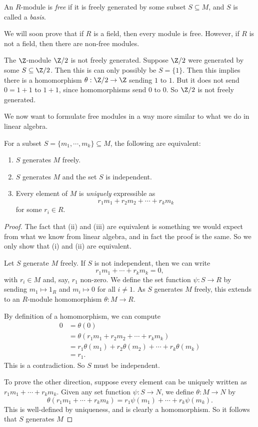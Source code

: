 \documentclass[a4paper]{article}
\begin{document}
\begin{defi}
  An $R$-module is \emph{free} if it is freely generated by some subset $S \subseteq M$, and $S$ is called a \emph{basis}.
\end{defi}
We will soon prove that if $R$ is a field, then every module is free. However, if $R$ is not a field, then there are non-free modules.
\begin{eg}
  The $\Z$-module $\Z/2$ is not freely generated. Suppose $\Z/2$ were generated by some $S \subseteq \Z/2$. Then this is can only possibly be $S = \{1\}$. Then this implies there is a homomorphism $\theta: \Z/2 \to \Z$ sending $1$ to $1$. But it does not send $0 = 1 + 1$ to $1 + 1$, since homomorphisms send $0$ to $0$. So $\Z/2$ is not freely generated.
\end{eg}

We now want to formulate free modules in a way more similar to what we do in linear algebra.
\begin{prop}
  For a subset $S = \{m_1, \cdots, m_k\} \subseteq M$, the following are equivalent:
  \begin{enumerate}
    \item $S$ generates $M$ freely.
    \item $S$ generates $M$ and the set $S$ is independent.
    \item Every element of $M$ is \emph{uniquely} expressible as
      \[
        r_1 m_1 + r_2 m_2 + \cdots + r_k m_k
      \]
      for some $r_i \in R$.
  \end{enumerate}
\end{prop}
\begin{proof}
  The fact that (ii) and (iii) are equivalent is something we would expect from what we know from linear algebra, and in fact the proof is the same. So we only show that (i) and (ii) are equivalent.

  Let $S$ generate $M$ freely. If $S$ is not independent, then we can write
  \[
    r_1 m_1 + \cdots + r_k m_k = 0,
  \]
  with $r_i \in M$ and, say, $r_1$ non-zero. We define the set function $\psi: S \to R$ by sending $m_1 \mapsto 1_R$ and $m_i \mapsto 0$ for all $i \not= 1$. As $S$ generates $M$ freely, this extends to an $R$-module homomorphism $\theta: M \to R$.

  By definition of a homomorphism, we can compute
  \begin{align*}
    0 &= \theta(0)\\
    &= \theta(r_1 m_1 + r_2 m_2 + \cdots + r_k m_k) \\
    &= r_1\theta(m_1) + r_2 \theta(m_2) + \cdots + r_k \theta(m_k)\\
    &= r_1.
  \end{align*}
  This is a contradiction. So $S$ must be independent.

  To prove the other direction, suppose every element can be uniquely written as $r_1m_1 + \cdots + r_k m_k$. Given any set function $\psi: S \to N$, we define $\theta: M \to N$ by
  \[
    \theta(r_1m_1 + \cdots + r_k m_k) = r_1 \psi(m_1) + \cdots + r_k \psi(m_k).
  \]
  This is well-defined by uniqueness, and is clearly a homomorphism. So it follows that $S$ generates $M$
\end{proof}
\end{document}
